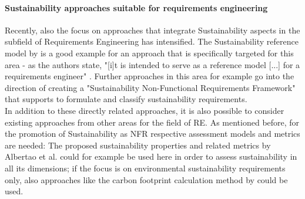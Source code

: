 \documentclass[oribibl]{llncs}
\begin{document}


\paragraph{Sustainability approaches suitable for requirements engineering}
Recently, also the focus on approaches that integrate Sustainability aspects in the subfield of Requirements Engineering has intensified. %
The Sustainability reference model by \cite{penzenstadler_generic_2013} is a good example for an approach that is specifically targeted for this area - as the authors state, "[i]t is intended to serve as a reference model [...] for a requirements engineer" \cite{penzenstadler_generic_2013} %
. Further approaches in this area for example go into the direction of creating a "Sustainability Non-Functional Requirements Framework" \cite{raturi_developing_2014} that supports to formulate and classify sustainability requirements. %
\\
In addition to these directly related approaches, it is also possible to consider existing approaches from other areas for the field of RE. As mentioned before, for the promotion of Sustainability as NFR respective assessment models and metrics are needed: The proposed sustainability properties and related metrics by Albertao et al. \cite{albertao_measuring_2010} could for example be used here in order to assess sustainability in all its dimensions; if the focus is on environmental sustainability requirements only, also approaches like the carbon footprint calculation method by \cite{kern_impacts_2015} could be used.
\end{document}
